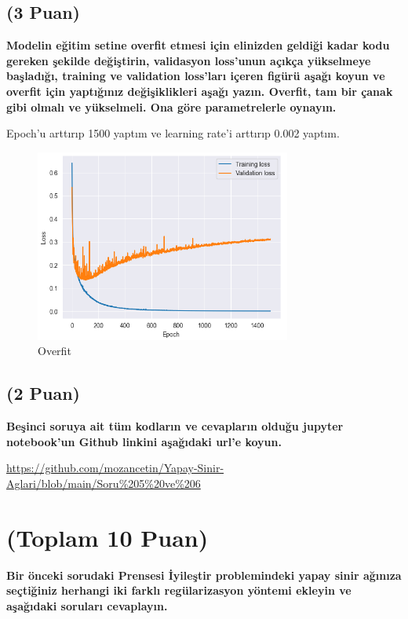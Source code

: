 \documentclass[11pt]{article}
\begin{document}
\subsection{(3 Puan)} \textbf{Modelin eğitim setine overfit etmesi için elinizden geldiği kadar kodu gereken şekilde değiştirin, validasyon loss'unun açıkça yükselmeye başladığı, training ve validation loss'ları içeren figürü aşağı koyun ve overfit için yaptığınız değişiklikleri aşağı yazın. Overfit, tam bir çanak gibi olmalı ve yükselmeli. Ona göre parametrelerle oynayın.}

Epoch'u arttırıp 1500 yaptım ve learning rate'i arttırıp 0.002 yaptım.


\begin{figure}[ht!]
    \centering
    \includegraphics[width=0.75\textwidth]{overfit.png}
    \caption{Overfit}
    \label{fig:my_pic}
\end{figure}


\subsection{(2 Puan)} \textbf{Beşinci soruya ait tüm kodların ve cevapların olduğu jupyter notebook'un Github linkini aşağıdaki url'e koyun.}

\url{https://github.com/mozancetin/Yapay-Sinir-Aglari/blob/main/Soru%205%20ve%206}

\section{(Toplam 10 Puan)} \textbf{Bir önceki sorudaki Prensesi İyileştir problemindeki yapay sinir ağınıza seçtiğiniz herhangi iki farklı regülarizasyon yöntemi ekleyin ve aşağıdaki soruları cevaplayın.} 
\end{document}
